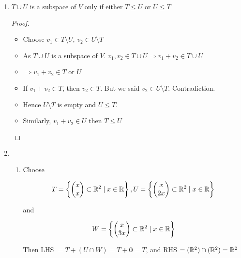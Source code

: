 \documentclass[a4paper]{article}
\begin{document}
	\begin{enumerate}
	\item \begin{prop} 
		$ T \cup U $ is a subspace of $ V $ only if either $ T \leq U $ or $ U \leq T $
		
	\end{prop}

	\begin{proof}
			\begin{itemize}
			\item Choose $ v_{1} \in T \setminus U $, $ v_{2} \in U \setminus T  $
			\item As $ T \cup U $ is a subspace of $ V $.  $ v_{1},v_{2} \in T \cup U \Rightarrow v_{1} + v_{2} \in T \cup U $
			\item $ \Rightarrow v_{1} + v_{2} \in T$ or $ U $ 
			\item If $ v_{1} + v_{2} \in T $, then $ v_{2} \in T $. But we said $ v_{2} \in U \setminus T $. Contradiction.
			\item Hence $ U \setminus T $ is empty and $ U \leq T $. 
			\item Similarly, $ v_{1} + v_{2} \in U $ then $ T \leq U $
		\end{itemize} 
	\end{proof}

	\item 
	\begin{enumerate}[label = (\alph*)]
		\item Choose 
		
		\[ T = \left\{  \begin{pmatrix}
		x\\
		x\\
		\end{pmatrix} \subset \mathbb{R}^{2} \; | \; x \in \mathbb{R} \right\}, U = \left\{  \begin{pmatrix}
		x\\
		2x\\
		\end{pmatrix} \subset \mathbb{R}^{2} \; | \; x \in \mathbb{R} \right\} \]
		
		and 
		
		\[ W = \left\{  \begin{pmatrix}
		x\\
		3x\\
		\end{pmatrix} \subset \mathbb{R}^{2} \; | \; x \in \mathbb{R} \right\} \]
		
		
		Then LHS $ =  T + (U \cap W) = T + \mathbf{0} = T$, and RHS $ = (\mathbb{R}^{2}) \cap (\mathbb{R}^{2})  = \mathbb{R}^{2} $ 
		

\end{enumerate}
\end{enumerate}
\end{document}
